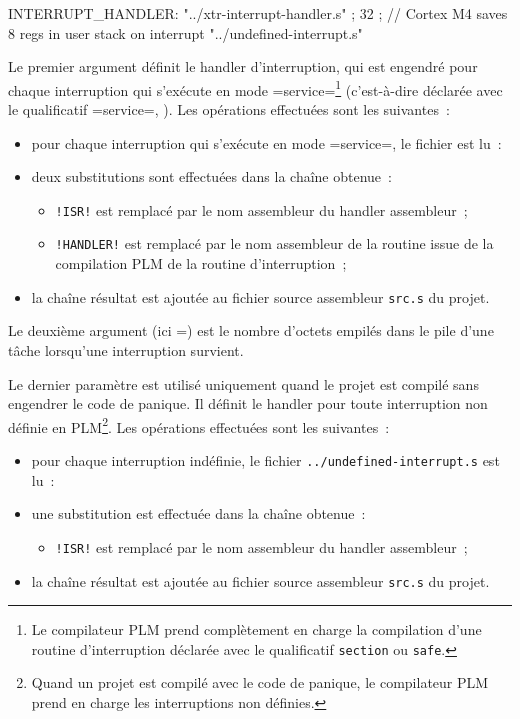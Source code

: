 \begin{PLM}
INTERRUPT_HANDLER:
  "../xtr-interrupt-handler.s" ;
  32 ; // Cortex M4 saves 8 regs in user stack on interrupt
  "../undefined-interrupt.s"
\end{PLM}

Le premier argument définit le handler d'interruption, qui est engendré pour chaque interruption qui s'exécute en mode \plm=service=\footnote{Le compilateur PLM prend complètement en charge la compilation d'une routine d'interruption déclarée avec le qualificatif \texttt{section} ou  \texttt{safe}.} (c'est-à-dire déclarée avec le qualificatif \plm=service=, ). Les opérations effectuées sont les suivantes~:
\begin{itemize}
  \item pour chaque interruption qui s'exécute en mode \plm=service=, le fichier est lu~:
  \item deux substitutions sont effectuées dans la chaîne obtenue~:
  \begin{itemize}
    \item \texttt{!ISR!} est remplacé par le nom assembleur du handler assembleur~;
    \item \texttt{!HANDLER!} est remplacé par le nom assembleur de la routine issue de la compilation PLM de la routine d'interruption~;
  \end{itemize}
  \item la chaîne résultat est ajoutée au fichier source assembleur \texttt{src.s} du projet.
\end{itemize}



Le deuxième argument (ici =) est le nombre d'octets empilés dans le pile d'une tâche lorsqu'une interruption survient.



Le dernier paramètre est utilisé uniquement quand le projet est compilé sans engendrer le code de panique. Il définit le handler pour toute interruption non définie en PLM\footnote{Quand un projet est compilé avec le code de panique, le compilateur PLM prend en charge les interruptions non définies.}. Les opérations effectuées sont les suivantes~:
\begin{itemize}
  \item pour chaque interruption indéfinie, le fichier \texttt{../undefined-interrupt.s} est lu~:
  \item une substitution est effectuée dans la chaîne obtenue~:
  \begin{itemize}
    \item \texttt{!ISR!} est remplacé par le nom assembleur du handler assembleur~;
  \end{itemize}
  \item la chaîne résultat est ajoutée au fichier source assembleur \texttt{src.s} du projet.
\end{itemize}








